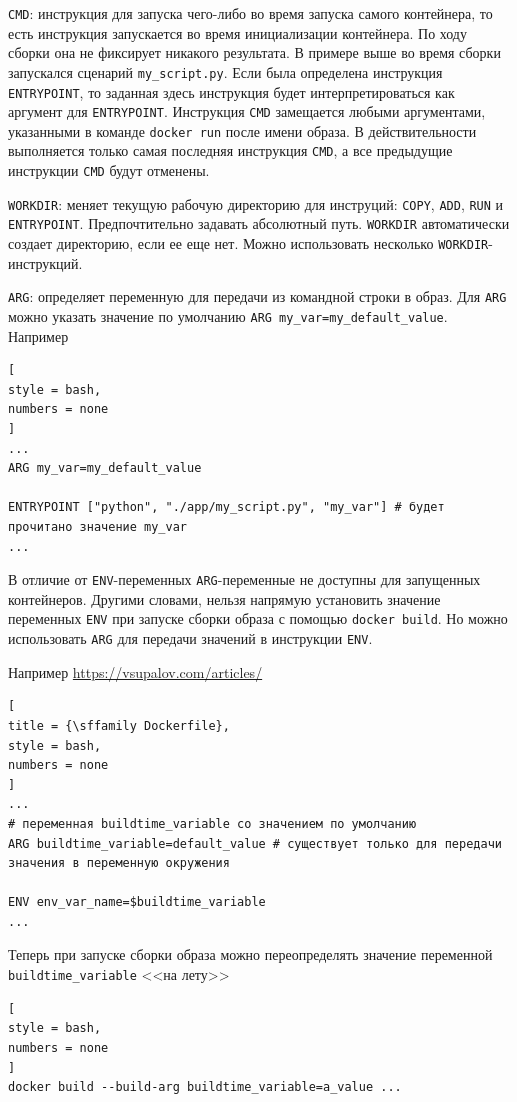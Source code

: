 \documentclass[%
	11pt,
	a4paper,
	utf8,
		]{article}
\begin{document}
\texttt{CMD}: инструкция для запуска чего-либо во время запуска самого контейнера, то есть инструкция запускается во время инициализации контейнера. По ходу сборки она не фиксирует никакого результата. В примере выше во время сборки запускался сценарий \verb|my_script.py|. Если была определена инструкция \texttt{ENTRYPOINT}, то заданная здесь инструкция будет интерпретироваться как аргумент для \texttt{ENTRYPOINT}. Инструкция \texttt{CMD} замещается любыми аргументами, указанными в команде \texttt{docker run} после имени образа. В действительности выполняется только самая последняя инструкция \texttt{CMD}, а все предыдущие инструкции \texttt{CMD} будут отменены.

\texttt{WORKDIR}: меняет текущую рабочую директорию для инструций: \texttt{COPY}, \texttt{ADD}, \texttt{RUN} и \texttt{ENTRYPOINT}. Предпочтительно задавать абсолютный путь. \texttt{WORKDIR} автоматически создает директорию, если ее еще нет. Можно использовать несколько \texttt{WORKDIR}-инструкций.

\texttt{ARG}: определяет переменную для передачи из командной строки в образ. Для \texttt{ARG} можно указать значение по умолчанию \texttt{ARG my\_var=my\_default\_value}. Например
\begin{lstlisting}[
style = bash,
numbers = none	
]
...
ARG my_var=my_default_value

ENTRYPOINT ["python", "./app/my_script.py", "my_var"] # будет прочитано значение my_var
...
\end{lstlisting}

В отличие от \texttt{ENV}-переменных \texttt{ARG}-переменные не доступны для запущенных контейнеров. Другими словами, нельзя напрямую установить значение переменных \texttt{ENV} при запуске сборки образа с помощью \texttt{docker build}. Но можно использовать \texttt{ARG} для передачи значений в инструкции \texttt{ENV}.

Например \url{https://vsupalov.com/articles/}
\begin{lstlisting}[
title = {\sffamily Dockerfile},
style = bash,
numbers = none	
]
...
# переменная buildtime_variable со значением по умолчанию
ARG buildtime_variable=default_value # существует только для передачи значения в переменную окружения

ENV env_var_name=$buildtime_variable
...
\end{lstlisting}

Теперь при запуске сборки образа можно переопределять значение переменной \verb|buildtime_variable| <<на лету>>
\begin{lstlisting}[
style = bash,
numbers = none	
]
docker build --build-arg buildtime_variable=a_value ...
\end{lstlisting}
\end{document}
